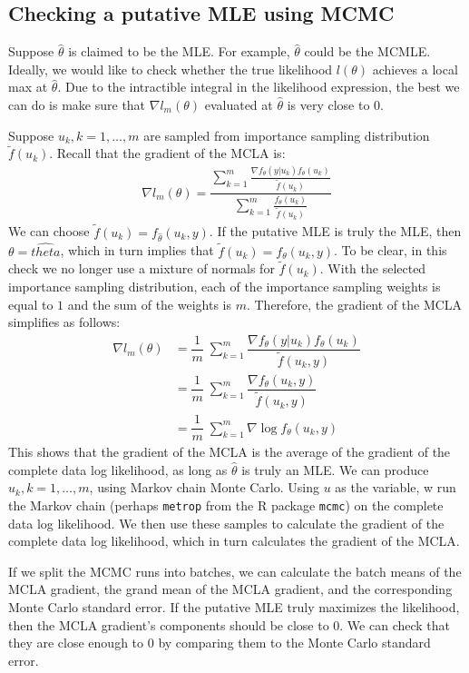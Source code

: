 \documentclass{article}
\begin{document}
\subsection{Checking a putative MLE using MCMC}

Suppose $\hat{\theta}$ is claimed to be the MLE. For example, $\hat{\theta}$ could be the MCMLE.  Ideally, we would like to check whether the true likelihood $l(\theta)$ achieves a local max at $\hat{\theta}$.  Due to the intractible integral in the likelihood expression, the best we can do is make sure that  $\nabla l_m(\theta)$ evaluated at $\hat{\theta}$ is very close to $0$. 

Suppose $u_k,k=1,\ldots,m$ are sampled from importance sampling distribution $\tilde{f} (u_k)$. Recall that the gradient of the MCLA is:
\begin{align}
\nabla l_{m}(\theta) = \dfrac{\sum_{k=1}^m\frac{\nabla f_\theta(y|u_k) f_\theta(u_k)   }{\tilde{f}(u_k)}}{\sum_{k=1}^m \frac{  f_\theta(u_k)   }{\tilde{f}(u_k)}}
\end{align}
We can choose $\tilde{f}(u_k)=f_{\hat{\theta}}(u_k,y)$. If the putative MLE is truly the MLE, then $\theta=\hat{theta}$, which in turn implies that $\tilde{f}(u_k)=f_{{\theta}}(u_k,y)$.   To be clear, in this check  we no longer use a mixture of normals for $\tilde{f}(u_k)$.  With the selected importance sampling distribution, each of the importance sampling weights is equal to $1$ and the sum of the weights is $m$.  Therefore, the gradient of the MCLA simplifies as follows:
\begin{align}
\nabla l_{m}(\theta) &=\dfrac{1}{m} \; {\sum_{k=1}^m\dfrac{\nabla f_\theta(y|u_k) f_\theta(u_k)   }{\tilde{f}(u_k,y)}}\\
&= \dfrac{1}{m} \; {\sum_{k=1}^m\dfrac{\nabla f_\theta(u_k,y)   }{\tilde{f}(u_k,y)}} \\
&= \dfrac{1}{m} \; \sum_{k=1}^m \nabla \log f_\theta(u_k,y)
\end{align}
This shows that the gradient of the MCLA is the average of the gradient of the complete data log likelihood, as long as $\hat{\theta}$ is truly an MLE. We can produce $u_k,k=1,\ldots,m$, using Markov chain Monte Carlo. Using $u$ as the variable, w run the Markov chain (perhaps \texttt{metrop} from the R package \texttt{mcmc}) on the complete data log likelihood.  We then use these samples to calculate the gradient of the complete data log likelihood, which in turn calculates the gradient of the MCLA. 

 If we split the MCMC runs into batches, we can calculate the batch means of the MCLA gradient, the grand mean of the MCLA gradient, and the corresponding Monte Carlo standard error.  If the putative MLE truly maximizes the likelihood, then the MCLA gradient's components should be close to $0$. We can check that they are close enough to $0$ by comparing them to the Monte Carlo standard error.
\end{document}
